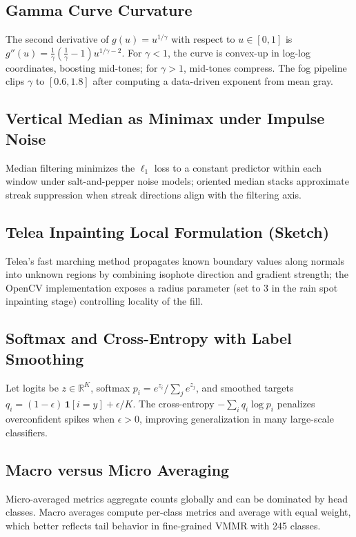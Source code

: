 \subsection{Gamma Curve Curvature}
The second derivative of $g(u)=u^{1/\gamma}$ with respect to $u\in[0,1]$ is $g''(u)=\tfrac{1}{\gamma}(\tfrac{1}{\gamma}-1)u^{1/\gamma-2}$. For $\gamma<1$, the curve is convex-up in log-log coordinates, boosting mid-tones; for $\gamma>1$, mid-tones compress. The fog pipeline clips $\gamma$ to $[0.6,1.8]$ after computing a data-driven exponent from mean gray.

\subsection{Vertical Median as Minimax under Impulse Noise}
Median filtering minimizes the $\ell_1$ loss to a constant predictor within each window under salt-and-pepper noise models; oriented median stacks approximate streak suppression when streak directions align with the filtering axis.

\subsection{Telea Inpainting Local Formulation (Sketch)}
Telea's fast marching method propagates known boundary values along normals into unknown regions by combining isophote direction and gradient strength; the OpenCV implementation exposes a radius parameter (set to 3 in the rain spot inpainting stage) controlling locality of the fill.

\subsection{Softmax and Cross-Entropy with Label Smoothing}
Let logits be $z\in\mathbb{R}^K$, softmax $p_i=e^{z_i}/\sum_j e^{z_j}$, and smoothed targets $q_i=(1-\epsilon)\,\mathbf{1}[i=y]+\epsilon/K$. The cross-entropy $-\sum_i q_i\log p_i$ penalizes overconfident spikes when $\epsilon>0$, improving generalization in many large-scale classifiers.

\subsection{Macro versus Micro Averaging}
Micro-averaged metrics aggregate counts globally and can be dominated by head classes. Macro averages compute per-class metrics and average with equal weight, which better reflects tail behavior in fine-grained VMMR with 245 classes.

